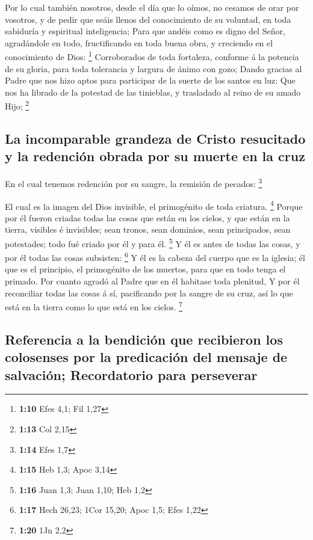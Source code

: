  Por lo cual también nosotros, desde el día que lo oímos,
no cesamos de orar por vosotros, y de pedir que seáis llenos del
conocimiento de su voluntad, en toda sabiduría y espiritual
inteligencia;  Para que andéis como es digno del Señor,
agradándole en todo, fructificando en toda buena obra, y creciendo en el
conocimiento de Dios: \footnote{\textbf{1:10} Efes 4,1; Fil 1,27}
 Corroborados de toda fortaleza, conforme á la potencia
de su gloria, para toda tolerancia y largura de ánimo con gozo;
 Dando gracias al Padre que nos hizo aptos para
participar de la suerte de los santos en luz:  Que nos ha
librado de la potestad de las tinieblas, y trasladado al reino de su
amado Hijo; \footnote{\textbf{1:13} Col 2,15}

\hypertarget{la-incomparable-grandeza-de-cristo-resucitado-y-la-redenciuxf3n-obrada-por-su-muerte-en-la-cruz}{%
\subsection{La incomparable grandeza de Cristo resucitado y la redención
obrada por su muerte en la
cruz}\label{la-incomparable-grandeza-de-cristo-resucitado-y-la-redenciuxf3n-obrada-por-su-muerte-en-la-cruz}}

 En el cual tenemos redención por su sangre, la remisión
de pecados: \footnote{\textbf{1:14} Efes 1,7}

 El cual es la imagen del Dios invisible, el primogénito
de toda criatura. \footnote{\textbf{1:15} Heb 1,3; Apoc 3,14}
 Porque por él fueron criadas todas las cosas que están
en los cielos, y que están en la tierra, visibles é invisibles; sean
tronos, sean dominios, sean principados, sean potestades; todo fué
criado por él y para él. \footnote{\textbf{1:16} Juan 1,3; Juan 1,10;
  Heb 1,2}  Y él es antes de todas las cosas, y por él
todas las cosas subsisten: \footnote{\textbf{1:17} Hech 26,23; 1Cor
  15,20; Apoc 1,5; Efes 1,22}  Y él es la cabeza del
cuerpo que es la iglesia; él que es el principio, el primogénito de los
muertos, para que en todo tenga el primado.  Por cuanto
agradó al Padre que en él habitase toda plenitud,  Y por
él reconciliar todas las cosas á sí, pacificando por la sangre de su
cruz, así lo que está en la tierra como lo que está en los cielos.
\footnote{\textbf{1:20} 1Jn 2,2}

\hypertarget{referencia-a-la-bendiciuxf3n-que-recibieron-los-colosenses-por-la-predicaciuxf3n-del-mensaje-de-salvaciuxf3n-recordatorio-para-perseverar}{%
\subsection{Referencia a la bendición que recibieron los colosenses por
la predicación del mensaje de salvación; Recordatorio para
perseverar}\label{referencia-a-la-bendiciuxf3n-que-recibieron-los-colosenses-por-la-predicaciuxf3n-del-mensaje-de-salvaciuxf3n-recordatorio-para-perseverar}}

